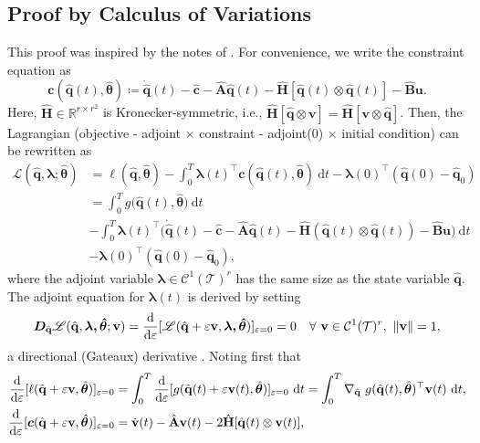 \subsection*{Proof by Calculus of Variations}

This proof was inspired by the notes of \cite{mcquarrie2024bayesian}. For convenience, we write the constraint equation as\\ 
$$\boldsymbol{c}(\hat{\mathbf{q}}(t),\hat{\bm{\theta}}) \coloneqq \dot{\hat{\mathbf{q}}}(t) - \hat{\mathbf{c}} - \hat{\mathbf{A}}\hat{\mathbf{q}}(t) - \hat{\mathbf{H}}[\hat{\mathbf{q}}(t)\otimes \hat{\mathbf{q}}(t)] - \hat{\mathbf{B}}\mathbf{u}.$$
Here, $\hat{\mathbf{H}}\in \mathbb{R}^{r\times r^2}$ is Kronecker-symmetric, i.e., $\hat{\mathbf{H}}[\hat{\mathbf{q}}\otimes \mathbf{v}] = \hat{\mathbf{H}}[\mathbf{v}\otimes \hat{\mathbf{q}}]$. Then, the Lagrangian (objective - adjoint $\times$ constraint - adjoint(0) $\times$ initial condition) can be rewritten as\\
\begin{align*}
    \mathscr{L}(\hat{\mathbf{q}}, \bm{\lambda}; \hat{\bm{\theta}}) &= \ell(\hat{\mathbf{q}},\hat{\bm{\theta}}) - \int_0^T \bm{\lambda}(t)^{\top}\boldsymbol{c}(\hat{\mathbf{q}}(t),\hat{\bm{\theta}})~\mathrm{d}t - \bm{\lambda}(0)^{\top}(\hat{\mathbf{q}}(0)-\hat{\mathbf{q}}_0)\\
    &= \int_0^T g\bigl(\hat{\mathbf{q}}(t),\hat{\bm{\theta}} \bigl)~\mathrm{d}t \\
    &- \int_0^T \bm{\lambda}(t)^{\top}\bigl(\dot{\hat{\mathbf{q}}}(t) - \hat{\mathbf{c}} - \hat{\mathbf{A}}\hat{\mathbf{q}}(t) - \hat{\mathbf{H}}(\hat{\mathbf{q}}(t)\otimes \hat{\mathbf{q}}(t)) - \hat{\mathbf{B}}\mathbf{u}\bigr)~\mathrm{d}t \\
    &-\bm{\lambda}(0)^{\top}(\hat{\mathbf{q}}(0)-\hat{\mathbf{q}}_0),
\end{align*}
where the adjoint variable $\bm{\lambda}\in\mathcal{C}^1(\mathcal{T})^r$ has the same size as the state variable $\hat{\mathbf{q}}$. The adjoint equation for $\bm{\lambda}(t)$ is derived by setting\\
$$ \bm{D}_{\hat{\mathbf{q}}} \mathscr{L}(\hat{\mathbf{q}},\bm{\lambda,\hat{\bm{\theta}}};\mathbf{v}) = \dv{}{\varepsilon}[\mathscr{L}(\hat{\mathbf{q}}+\varepsilon \mathbf{v},\bm{\lambda,\hat{\bm{\theta}}})]_{\varepsilon=0} = 0~~~\forall~\mathbf{v}\in\mathcal{C}^1(\mathcal{T})^r,~\norm{\mathbf{v}} = 1,$$a directional (Gateaux) derivative \cite{bonnans2013perturbation}. Noting first that\\
\begin{align*}
    \dv{}{\varepsilon}[\mathcal{\ell}(\hat{\mathbf{q}}+\varepsilon \mathbf{v},\hat{\bm{\theta}})]_{\varepsilon=0} &= \int_0^T \dv{}{\varepsilon}[g(\hat{\mathbf{q}}(t)+\varepsilon \mathbf{v}(t),\hat{\bm{\theta}})]_{\varepsilon=0}~\mathrm{d}t = \int_0^T \nabla_{\hat{\mathbf{q}}}~g(\hat{\mathbf{q}}(t),\hat{\bm{\theta}})^{\top}\mathbf{v}(t)~\mathrm{d}t,\\
    \dv{}{\varepsilon}[\boldsymbol{c}(\hat{\mathbf{q}}+\varepsilon \mathbf{v},\hat{\bm{\theta}})]_{\varepsilon=0} &= \dot{\mathbf{v}}(t) - \hat{\mathbf{A}}\mathbf{v}(t) - 2\hat{\mathbf{H}}[\hat{\mathbf{q}}(t)\otimes \mathbf{v}(t)],
\end{align*}
